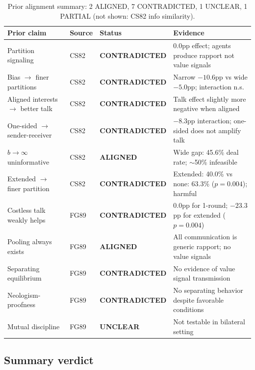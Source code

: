 \documentclass[11pt]{article}
\begin{document}
\begin{table}[htbp]
\centering
\small
\begin{tabularx}{\textwidth}{@{}l l l Y@{}}
\toprule
\textbf{Prior claim} & \textbf{Source} & \textbf{Status} & \textbf{Evidence} \\
\midrule
Partition signaling & CS82 & \textcolor{Contradicted}{\textbf{CONTRADICTED}} & 0.0pp effect; agents produce rapport not value signals \\
Bias $\to$ finer partitions & CS82 & \textcolor{Contradicted}{\textbf{CONTRADICTED}} & Narrow $-10.6$pp vs wide $-5.0$pp; interaction n.s. \\
Aligned interests $\to$ better talk & CS82 & \textcolor{Contradicted}{\textbf{CONTRADICTED}} & Talk effect slightly more negative when aligned \\
One-sided $\to$ sender-receiver & CS82 & \textcolor{Contradicted}{\textbf{CONTRADICTED}} & $-8.3$pp interaction; one-sided does not amplify talk \\
$b \to \infty$ uninformative & CS82 & \textcolor{Aligned}{\textbf{ALIGNED}} & Wide gap: 45.6\% deal rate; $\sim$50\% infeasible \\
Extended $\to$ finer partition & CS82 & \textcolor{Contradicted}{\textbf{CONTRADICTED}} & Extended: 40.0\% vs none: 63.3\% ($p=0.004$); harmful \\
Costless talk weakly helps & FG89 & \textcolor{Contradicted}{\textbf{CONTRADICTED}} & 0.0pp for 1-round; $-23.3$pp for extended ($p=0.004$) \\
Pooling always exists & FG89 & \textcolor{Aligned}{\textbf{ALIGNED}} & All communication is generic rapport; no value signals \\
Separating equilibrium & FG89 & \textcolor{Contradicted}{\textbf{CONTRADICTED}} & No evidence of value signal transmission \\
Neologism-proofness & FG89 & \textcolor{Contradicted}{\textbf{CONTRADICTED}} & No separating behavior despite favorable conditions \\
Mutual discipline & FG89 & \textcolor{Unclear}{\textbf{UNCLEAR}} & Not testable in bilateral setting \\
\bottomrule
\end{tabularx}
\caption{Prior alignment summary: 2 ALIGNED, 7 CONTRADICTED, 1 UNCLEAR, 1 PARTIAL (not shown: CS82 info similarity).}
\label{tab:prior-alignment}
\end{table}

\subsection{Summary verdict}
\end{document}
